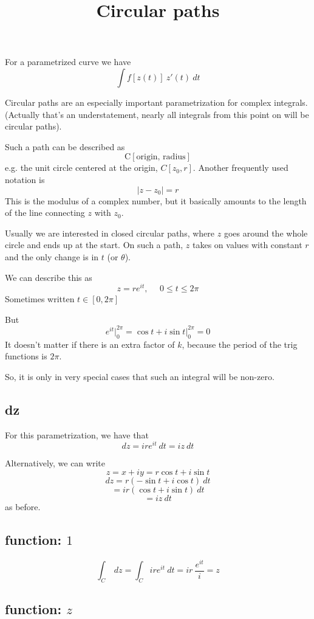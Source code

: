 \documentclass[11pt, oneside]{article}
\title{Circular paths}
\date{}
\begin{document}
\maketitle
\Large


For a parametrized curve we have
\[ \int f[z(t)] \ z'(t) \ dt \]

Circular paths are an especially important parametrization for complex integrals.  (Actually that's an understatement, nearly all integrals from this point on will be circular paths).

Such a path can be described as
\[ \text{C}[\text{origin, radius}] \]
e.g. the unit circle centered at the origin, $C[z_0,r]$.  Another frequently used notation is
\[ |z - z_0| = r \]
This is the modulus of a complex number, but it basically amounts to the length of the line connecting $z$ with $z_0$.

Usually we are interested in closed circular paths, where $z$ goes around the whole circle and ends up at the start.  On such a path, $z$ takes on values with constant $r$ and the only change is in $t$ (or $\theta$).

We can describe  this as 
\[ z = re^{it}, \ \ \ \ \ \ 0 \le t \le 2 \pi \]
Sometimes written $t \in [0, 2 \pi]$

But 
\[ e^{it} \bigg |_0^{2 \pi} = \cos t + i \sin t \bigg |_0^{2 \pi} = 0 \]
It doesn't matter if there is an extra factor of $k$, because the period of the trig functions is $2 \pi$.

So, it is only in very special cases that such an integral will be non-zero.

\subsection*{dz}
For this parametrization, we have that
\[ dz = ir e^{it} \ dt = i z \ dt  \]

Alternatively, we can write
\[ z = x + i y = r \cos t + i \sin t \]
\[ dz = r (- \sin t + i \cos t ) \ dt \]
\[ = ir (\cos t + i \sin t) \ dt \]
\[ = iz \ dt \]
as before.

\subsection*{function:  $1$}
\[ \int_C \ dz = \int_C ir e^{it} \ dt = ir \ \frac{e^{it}}{i} = z \]

\subsection*{function:  $z$}
\end{document}
